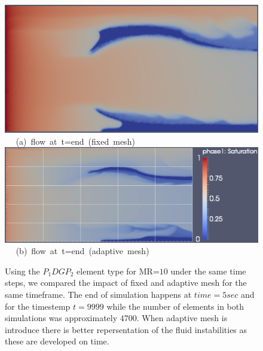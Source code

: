 \begin{landscape}
\begin{figure}[ht] 
\vbox{
\hbox{\hspace{3.5cm}
\includegraphics[width=.65\textwidth]{./Pics1/mr10_5regions_fixed/5regions_fixed_2000.pdf} 
}
\vspace{0.0cm}
\hbox{\hspace{6.5cm} (a) flow at t=end (fixed mesh)   
}
\vspace{0.25cm}
\hbox{\hspace{3.5cm}
\includegraphics[width=.9\textwidth]{./Pics1/mr10_5regions_adapt/5regions_adapt_3000_1.pdf}
}
\vspace{0.0cm}
\hbox{\hspace{6.5cm} (b) flow at t=end (adaptive mesh)     
}
}     
\caption{Using the $P_{1}DGP_{2}$ element type for MR=$10$ under the same time steps, we compared the impact of fixed and adaptive mesh for the same timeframe. The end of simulation happens at $time=5 sec$ and for the timestemp $t=9999$ while the number of elements in both simulations was approximately $4700$. When adaptive mesh is introduce there is better repersentation of the fluid instabilities as these are developed on time.}
\label{fig:2testcase_d}
\end{figure}
\end{landscape}
\clearpage




